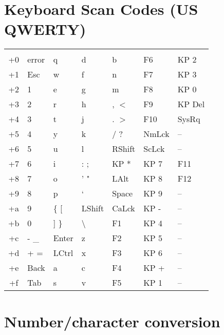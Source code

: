 \documentclass{refcard}
\begin{document}
\pagebreak

\section{Keyboard Scan Codes (US QWERTY)}


\newcommand{\ppkey}{\textbackslash{} \textbar}

\begin{tabular}{C@{\hspace{6ex}}llllll}
	   &  &  &  &  &  &  \\[1ex]
	+0 & error  & q      & d      & b      & F6     & KP 2   \\
	+1 & Esc    & w      & f      & n      & F7     & KP 3   \\
	+2 & 1      & e      & g      & m      & F8     & KP 0   \\
	+3 & 2      & r      & h      & , $<$  & F9     & KP Del \\

	+4 & 3      & t      & j      & . $>$  & F10    & SysRq  \\
	+5 & 4      & y      & k      & / ?    & NmLck  & --     \\
	+6 & 5      & u      & l      & RShift & ScLck  & --     \\
	+7 & 6      & i      & : ;    & KP *   & KP 7   & F11    \\

	+8 & 7      & o      & ' "    & LAlt   & KP 8   & F12    \\
	+9 & 8      & p      & ` ~    & Space  & KP 9   & --     \\
	+a & 9      & \{ [   & LShift & CaLck  & KP -   & --     \\
	+b & 0      & ] \}   & \ppkey & F1     & KP 4   & --     \\

	+c & - \_   & Enter  & z      & F2     & KP 5   & --     \\
	+d & + =    & LCtrl  & x      & F3     & KP 6   & --     \\
	+e & Back   & a      & c      & F4     & KP +   & --     \\
	+f & Tab    & s      & v      & F5     & KP 1   & --     \\
\end{tabular}


\section{Number/character conversion}
\end{document}

